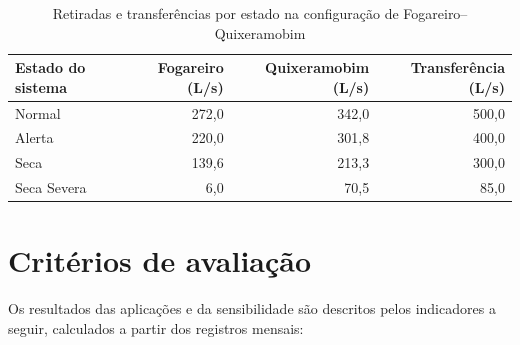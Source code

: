 \begin{table}[H]
    \captionsetup{width=15cm}
    \caption[Retiradas e transferências por estado em Fogareiro--Quixeramobim]{Retiradas e transferências por estado na configuração de Fogareiro--Quixeramobim}
    \label{tab:fq-regras}
    \centering
    \footnotesize
    \begin{tabular}{lrrr}
        \toprule
        Estado do sistema & Fogareiro (L/s) & Quixeramobim (L/s) & Transferência (L/s) \\
        \midrule
        Normal & 272,0 & 342,0 & 500,0 \\
        Alerta & 220,0 & 301,8 & 400,0 \\
        Seca & 139,6 & 213,3 & 300,0 \\
        Seca Severa & 6,0 & 70,5 & 85,0 \\
        \bottomrule
    \end{tabular}
\end{table}

\section{Critérios de avaliação}
\label{sec:criterios-avaliacao}

Os resultados das aplicações e da sensibilidade são descritos pelos indicadores a seguir, calculados a partir dos registros mensais:

